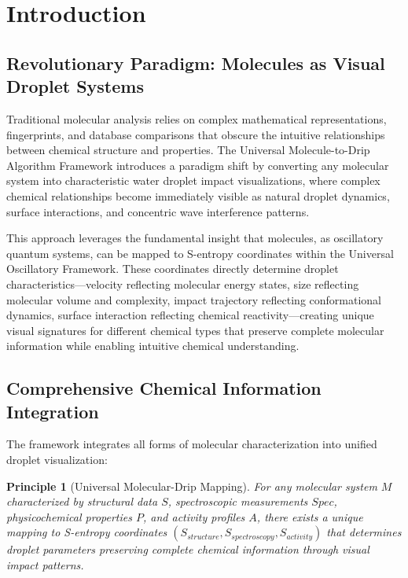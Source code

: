 \documentclass[12pt,a4paper]{article}
\newtheorem{principle}{Principle}
\begin{document}
\begin{abstract}
\textbf{Keywords:} molecule-to-drip conversion, cheminformatics computer vision, molecular S-entropy mapping, chemical droplet simulation, spectroscopic pattern recognition, universal molecular visualization, drug discovery computer vision, chemical property prediction
\end{abstract}

\section{Introduction}

\subsection{Revolutionary Paradigm: Molecules as Visual Droplet Systems}

Traditional molecular analysis relies on complex mathematical representations, fingerprints, and database comparisons that obscure the intuitive relationships between chemical structure and properties. The Universal Molecule-to-Drip Algorithm Framework introduces a paradigm shift by converting any molecular system into characteristic water droplet impact visualizations, where complex chemical relationships become immediately visible as natural droplet dynamics, surface interactions, and concentric wave interference patterns.

This approach leverages the fundamental insight that molecules, as oscillatory quantum systems, can be mapped to S-entropy coordinates within the Universal Oscillatory Framework. These coordinates directly determine droplet characteristics—velocity reflecting molecular energy states, size reflecting molecular volume and complexity, impact trajectory reflecting conformational dynamics, surface interaction reflecting chemical reactivity—creating unique visual signatures for different chemical types that preserve complete molecular information while enabling intuitive chemical understanding.

\subsection{Comprehensive Chemical Information Integration}

The framework integrates all forms of molecular characterization into unified droplet visualization:

\begin{principle}[Universal Molecular-Drip Mapping]
For any molecular system $M$ characterized by structural data $S$, spectroscopic measurements $Spec$, physicochemical properties $P$, and activity profiles $A$, there exists a unique mapping to S-entropy coordinates $(S_{structure}, S_{spectroscopy}, S_{activity})$ that determines droplet parameters preserving complete chemical information through visual impact patterns.
\end{principle}
\end{document}
